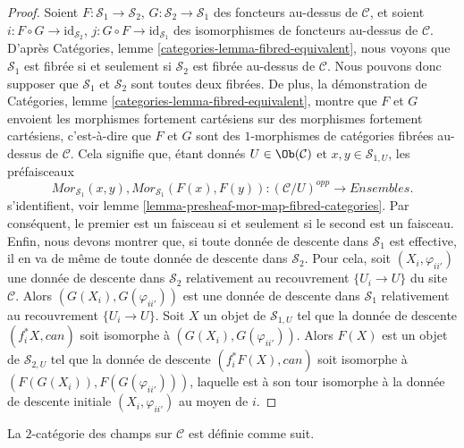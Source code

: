 \begin{proof}
Soient $F : \mathcal{S}_1 \to \mathcal{S}_2$,
$G : \mathcal{S}_2 \to \mathcal{S}_1$ des foncteurs au-dessus de $\mathcal{C}$, et soient
$i : F \circ G \to \text{id}_{\mathcal{S}_2}$,
$j : G \circ F \to \text{id}_{\mathcal{S}_1}$ des isomorphismes de
foncteurs au-dessus de $\mathcal{C}$. D'après
Catégories, lemme \ref{categories-lemma-fibred-equivalent},
nous voyons que $\mathcal{S}_1$ est fibrée si et seulement si $\mathcal{S}_2$
est fibrée au-dessus de $\mathcal{C}$. Nous pouvons donc supposer que
$\mathcal{S}_1$ et $\mathcal{S}_2$ sont toutes deux fibrées. De plus, la démonstration de
Catégories, lemme \ref{categories-lemma-fibred-equivalent},
montre que $F$ et $G$ envoient les morphismes fortement cartésiens sur des morphismes
fortement cartésiens, c'est-à-dire que $F$ et $G$ sont des $1$-morphismes de catégories
fibrées au-dessus de $\mathcal{C}$. Cela signifie que, étant donnés
$U \in \Ob(\mathcal{C})$ et $x, y \in \mathcal{S}_{1, U}$, les préfaisceaux
$$
\mathit{Mor}_{\mathcal{S}_1}(x, y),
\mathit{Mor}_{\mathcal{S}_1}(F(x), F(y)) :
(\mathcal{C}/U)^{opp} \longrightarrow \textit{Ensembles}.
$$
s'identifient, voir
lemme \ref{lemma-presheaf-mor-map-fibred-categories}. Par conséquent,
le premier est un faisceau si et seulement si le second est un faisceau.
Enfin, nous devons montrer que, si toute donnée de descente dans $\mathcal{S}_1$
est effective, il en va de même de toute donnée de descente dans $\mathcal{S}_2$.
Pour cela, soit $(X_i, \varphi_{ii'})$ une donnée de descente
dans $\mathcal{S}_2$ relativement au recouvrement $\{U_i \to U\}$ du site
$\mathcal{C}$. Alors $(G(X_i), G(\varphi_{ii'}))$ est une donnée de descente
dans $\mathcal{S}_1$ relativement au recouvrement $\{U_i \to U\}$.
Soit $X$ un objet de $\mathcal{S}_{1, U}$ tel que la
donnée de descente $(f_i^*X, can)$ soit isomorphe à
$(G(X_i), G(\varphi_{ii'}))$. Alors $F(X)$ est un objet de $\mathcal{S}_{2, U}$
tel que la donnée de descente $(f_i^*F(X), can)$ soit isomorphe à
$(F(G(X_i)), F(G(\varphi_{ii'})))$, laquelle est à son tour isomorphe à
la donnée de descente initiale $(X_i, \varphi_{ii'})$ au moyen de $i$.
\end{proof}

\noindent
La $2$-catégorie des champs sur $\mathcal{C}$
est définie comme suit.

